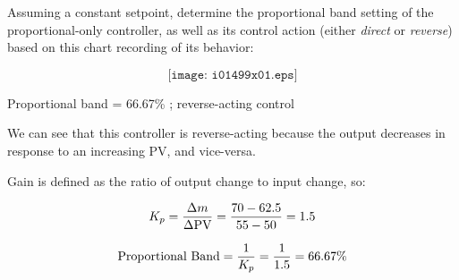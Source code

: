 

Assuming a constant setpoint, determine the proportional band setting of the proportional-only controller, as well as its control action (either {\it direct} or {\it reverse}) based on this chart recording of its behavior:

$$\texttt{[image: i01499x01.eps]}$$







Proportional band = 66.67\% ; reverse-acting control







We can see that this controller is reverse-acting because the output decreases in response to an increasing PV, and vice-versa.

\vskip 10pt

Gain is defined as the ratio of output change to input change, so:

$$K_p = {\Delta m \over \Delta \hbox{PV}} = {70 - 62.5 \over 55 - 50} = 1.5$$

$$\hbox{Proportional Band} = {1 \over K_p} = {1 \over 1.5} = 66.67\%$$




